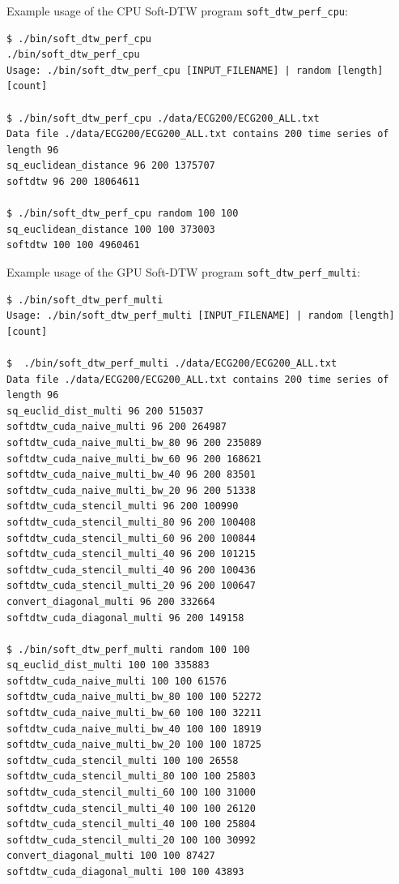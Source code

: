 \documentclass[12pt, letterpaper]{article}
\begin{document}
Example usage of the CPU Soft-DTW program \verb|soft_dtw_perf_cpu|:

\begin{verbatim}
$ ./bin/soft_dtw_perf_cpu
./bin/soft_dtw_perf_cpu
Usage: ./bin/soft_dtw_perf_cpu [INPUT_FILENAME] | random [length] [count]

$ ./bin/soft_dtw_perf_cpu ./data/ECG200/ECG200_ALL.txt
Data file ./data/ECG200/ECG200_ALL.txt contains 200 time series of length 96
sq_euclidean_distance 96 200 1375707
softdtw 96 200 18064611

$ ./bin/soft_dtw_perf_cpu random 100 100
sq_euclidean_distance 100 100 373003
softdtw 100 100 4960461

\end{verbatim}

Example usage of the GPU Soft-DTW program \verb|soft_dtw_perf_multi|:

\begin{verbatim}
$ ./bin/soft_dtw_perf_multi
Usage: ./bin/soft_dtw_perf_multi [INPUT_FILENAME] | random [length] [count]

$  ./bin/soft_dtw_perf_multi ./data/ECG200/ECG200_ALL.txt
Data file ./data/ECG200/ECG200_ALL.txt contains 200 time series of length 96
sq_euclid_dist_multi 96 200 515037
softdtw_cuda_naive_multi 96 200 264987
softdtw_cuda_naive_multi_bw_80 96 200 235089
softdtw_cuda_naive_multi_bw_60 96 200 168621
softdtw_cuda_naive_multi_bw_40 96 200 83501
softdtw_cuda_naive_multi_bw_20 96 200 51338
softdtw_cuda_stencil_multi 96 200 100990
softdtw_cuda_stencil_multi_80 96 200 100408
softdtw_cuda_stencil_multi_60 96 200 100844
softdtw_cuda_stencil_multi_40 96 200 101215
softdtw_cuda_stencil_multi_40 96 200 100436
softdtw_cuda_stencil_multi_20 96 200 100647
convert_diagonal_multi 96 200 332664
softdtw_cuda_diagonal_multi 96 200 149158

$ ./bin/soft_dtw_perf_multi random 100 100
sq_euclid_dist_multi 100 100 335883
softdtw_cuda_naive_multi 100 100 61576
softdtw_cuda_naive_multi_bw_80 100 100 52272
softdtw_cuda_naive_multi_bw_60 100 100 32211
softdtw_cuda_naive_multi_bw_40 100 100 18919
softdtw_cuda_naive_multi_bw_20 100 100 18725
softdtw_cuda_stencil_multi 100 100 26558
softdtw_cuda_stencil_multi_80 100 100 25803
softdtw_cuda_stencil_multi_60 100 100 31000
softdtw_cuda_stencil_multi_40 100 100 26120
softdtw_cuda_stencil_multi_40 100 100 25804
softdtw_cuda_stencil_multi_20 100 100 30992
convert_diagonal_multi 100 100 87427
softdtw_cuda_diagonal_multi 100 100 43893
\end{verbatim}
\end{document}
